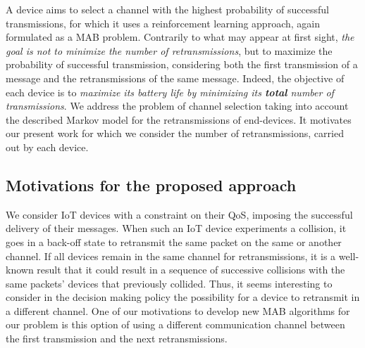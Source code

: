 A device aims to select a channel with the highest probability of successful transmissions, for which it uses a reinforcement learning approach, again formulated as a MAB problem.
Contrarily to what may appear at first sight,
\emph{the goal is not to minimize the number of retransmissions}, but to maximize the probability of successful transmission, considering both the first transmission of a message and the retransmissions of the same message.
Indeed, the objective of each device is to \emph{maximize its battery life by minimizing its \textbf{total} number of transmissions}.
%
We address the problem of channel selection taking into account the described Markov model for the retransmissions of end-devices.
It motivates our present work for which we consider the number of retransmissions, carried out by each device.
%

\subsection{Motivations for the proposed approach}
\label{sub:43:motivations}

We consider IoT devices with a constraint on their QoS, imposing the successful delivery of their messages.
When such an IoT device experiments a collision, it goes in a back-off state to retransmit the same packet on the same or another channel.
If all devices remain in the same channel for retransmissions, it is a well-known result that it could result in a sequence of successive collisions with the same packets' devices that previously collided.
%
Thus, it seems interesting to consider in the decision making policy the possibility for a device to retransmit in a different channel.
One of our motivations to develop new MAB algorithms for our problem is this option of using a different communication channel between the first transmission and the next retransmissions.

